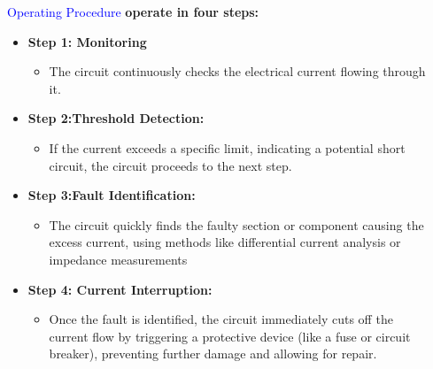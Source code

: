 \documentclass[final]{beamer}
\newlength{\sepwid}
\newlength{\onecolwid}
\begin{document}
\begin{frame}[t]
\begin{columns}[t]
\begin{column}{\sepwid}\end{column} %
\begin{column}{\onecolwid}
\begin{block}{\textcolor{blue}{Operating Procedure}}
\textbf  {\large operate in four steps:}

\begin{itemize}
\item \textbf{ Step 1: Monitoring}
\begin{itemize}
  \item The circuit continuously checks the electrical current flowing through it.
\end{itemize}



\item \textbf{Step 2:Threshold Detection:}
\begin{itemize}
  \item  If the current exceeds a specific limit, indicating a potential short circuit, the circuit proceeds to the next step.

\end{itemize}
\item \textbf{Step 3:Fault Identification:}
\begin{itemize}
  \item  The circuit quickly finds the faulty section or component causing the excess current, using methods like differential current analysis or impedance measurements
\end{itemize}
\item \textbf{Step 4: Current Interruption:}
\begin{itemize}
  \item  Once the fault is identified, the circuit immediately cuts off the current flow by triggering a protective device (like a fuse or circuit breaker), preventing further damage and allowing for repair.
\end{itemize}
\end{itemize}

\end{block}

\end{column} %

\end{columns}
\end{frame}
\end{document}
